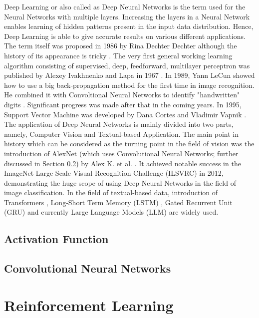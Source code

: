 \documentclass[en,]{template/rrlab}
\begin{document}
Deep Learning or also called as Deep Neural Networks is the term used for the Neural Networks with multiple layers. Increasing the layers in a Neural Network enables learning of hidden patterns present in the input data distribution. Hence, Deep Learning is able to give accurate results on various different applications. The term itself was proposed in 1986 by Rina Dechter Dechter although the history of its appearance is tricky \cite{Deepl}. The very first general working learning algorithm consisting of supervised, deep, feedforward, multilayer perceptron was published by Alexey Ivakhnenko and Lapa in 1967 \cite{ivakhnenko1967cybernetics}. In 1989, Yann LeCun showed how to use a big back-propagation method for the first time in image recognition. He combined it with Convoltional Neural Networks to identify "handwritten" digits \cite{LeCun1989BackpropagationAT}. Significant progress was made after that in the coming years. In 1995, Support Vector Machine was developed by Dana Cortes and Vladimir Vapnik \cite{cortes1995support}. The application of Deep Neural Networks is mainly divided into two parts, namely, Computer Vision and Textual-based Application. The main point in history which can be considered as the turning point in the field of vision was the introduction of AlexNet (which uses Convolutional Neural Networks; further discussed in Section \ref{CNN}) \cite{NIPS2012_c399862d} by Alex K. et al. . It achieved notable success in the ImageNet Large Scale Visual Recognition Challenge (ILSVRC) in 2012, demonstrating the huge scope of using Deep Neural Networks in the field of image classification. In the field of textual-based data, introduction of Transformers \cite{vaswani2023attention}, Long-Short Term Memory (LSTM) \cite{LSTM}, Gated Recurrent Unit (GRU) \cite{GRU} and currently Large Language Models (LLM) \cite{LLM} are widely used. 

\subsection{Activation Function }\label{activation_function}
\subsection{Convolutional Neural Networks}\label{CNN}


\section{Reinforcement Learning}\label{rf}
\end{document}
